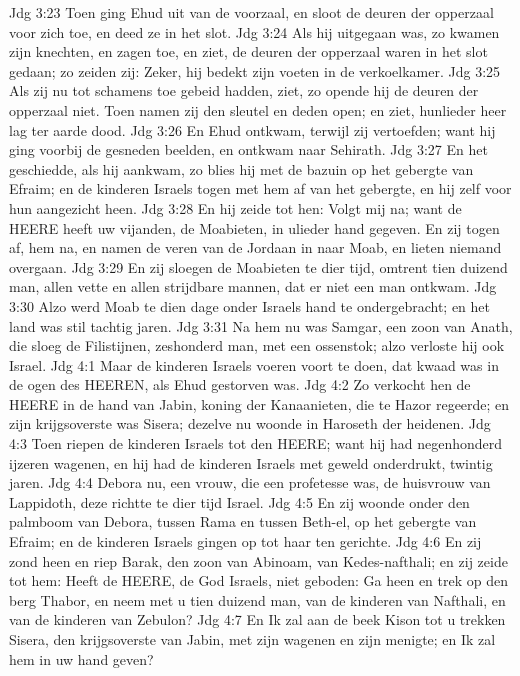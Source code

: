 Jdg 3:23  Toen ging Ehud uit van de voorzaal, en sloot de deuren der opperzaal voor zich toe, en deed ze in het slot.
Jdg 3:24  Als hij uitgegaan was, zo kwamen zijn knechten, en zagen toe, en ziet, de deuren der opperzaal waren in het slot gedaan; zo zeiden zij: Zeker, hij bedekt zijn voeten in de verkoelkamer.
Jdg 3:25  Als zij nu tot schamens toe gebeid hadden, ziet, zo opende hij de deuren der opperzaal niet. Toen namen zij den sleutel en deden open; en ziet, hunlieder heer lag ter aarde dood.
Jdg 3:26  En Ehud ontkwam, terwijl zij vertoefden; want hij ging voorbij de gesneden beelden, en ontkwam naar Sehirath.
Jdg 3:27  En het geschiedde, als hij aankwam, zo blies hij met de bazuin op het gebergte van Efraim; en de kinderen Israels togen met hem af van het gebergte, en hij zelf voor hun aangezicht heen.
Jdg 3:28  En hij zeide tot hen: Volgt mij na; want de HEERE heeft uw vijanden, de Moabieten, in ulieder hand gegeven. En zij togen af, hem na, en namen de veren van de Jordaan in naar Moab, en lieten niemand overgaan.
Jdg 3:29  En zij sloegen de Moabieten te dier tijd, omtrent tien duizend man, allen vette en allen strijdbare mannen, dat er niet een man ontkwam.
Jdg 3:30  Alzo werd Moab te dien dage onder Israels hand te ondergebracht; en het land was stil tachtig jaren.
Jdg 3:31  Na hem nu was Samgar, een zoon van Anath, die sloeg de Filistijnen, zeshonderd man, met een ossenstok; alzo verloste hij ook Israel.
Jdg 4:1  Maar de kinderen Israels voeren voort te doen, dat kwaad was in de ogen des HEEREN, als Ehud gestorven was.
Jdg 4:2  Zo verkocht hen de HEERE in de hand van Jabin, koning der Kanaanieten, die te Hazor regeerde; en zijn krijgsoverste was Sisera; dezelve nu woonde in Haroseth der heidenen.
Jdg 4:3  Toen riepen de kinderen Israels tot den HEERE; want hij had negenhonderd ijzeren wagenen, en hij had de kinderen Israels met geweld onderdrukt, twintig jaren.
Jdg 4:4  Debora nu, een vrouw, die een profetesse was, de huisvrouw van Lappidoth, deze richtte te dier tijd Israel.
Jdg 4:5  En zij woonde onder den palmboom van Debora, tussen Rama en tussen Beth-el, op het gebergte van Efraim; en de kinderen Israels gingen op tot haar ten gerichte.
Jdg 4:6  En zij zond heen en riep Barak, den zoon van Abinoam, van Kedes-nafthali; en zij zeide tot hem: Heeft de HEERE, de God Israels, niet geboden: Ga heen en trek op den berg Thabor, en neem met u tien duizend man, van de kinderen van Nafthali, en van de kinderen van Zebulon?
Jdg 4:7  En Ik zal aan de beek Kison tot u trekken Sisera, den krijgsoverste van Jabin, met zijn wagenen en zijn menigte; en Ik zal hem in uw hand geven?
